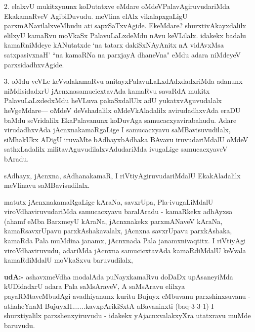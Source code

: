 \begin{artha}
2. elalxvU mukitxynunx koDutatxve eMdare oMdeVPalavAgiruvudariMda EkakamaRveV AgibiDuvudu. meVlina elAlx vikalapxgaLigU parxmANavilalxveMbudu ati sapxSaTxvAgide. EkeMdare? shurxtivAkayxdalilx elilxyU kamaRvu moVkaSx PalavuLaLxdeMdu nAvu keVLilalx. idakekx badalu kamaRniMdeye kANutatxde `na tatarx dakiSxNAyAnitx nA vidAvxMsa satxpasivxnaH' ``na kamaRNa na parxjayA dhaneVna" eMdu adara niMdeyeV parxsidadhxvAgide.
\end{artha}

\begin{artha}
3. oMdu veVLe keVvalakamaRvu anitayxPalavuLaLxdAdxdadxriMda adanunx niMdisidadxrU jAcnxnasamucicxtavAda kamaRvu savaRdA mukitx PalavuLaLxdedxMdu heVLuva pakaSxdalUlx adU yukatxvAguvudalalx heVgeMdare--- oMdeV deVshadalilx oMdeVkAladalilx avirudadhxvAda eraDU baMdu seVridalilx EkaPalavanunx koDuvAga samucacxyavirabahudu. Adare virudadhxvAda jAcnxnakamaRgaLige I samucacxyavu saMBavisuvudilalx, siMhakUkx ADigU iruvaMte bAdhayxbAdhaka BAvavu iruvudariMdalU oMdeV sathxLadalilx militavAguvudilalxvAdudariMda ivugaLige samucacxyaveV bAradu.
\end{artha}

\begin{artha}
sAdhayx, jAcnxna, sAdhanakamaR, I riVtiyAgiruvudariMdalU EkakAladalilx meVlinavu 
saMBavisudilalx.
\end{artha}


\begin{artha}
matutx jAcnxnakamaRgaLige kAraNa, savxrUpa, Pla-ivugaLiMdalU viroVdhaviruvudariMda samucacxyavu baralAradu - kamaRkekx adhAyxsa (ahamf eMba BarxmeyU kAraNa, jAcnxnakekx parxmANaveV kAraNa, kamaRsavxrUpavu parxkAshakavalalx, jAcnxna savxrUpavu parxkAshaka, kamaRda Pala muMdina janamx, jAcnxnada Pala janamxnivaqtitx. I riVtiyAgi viroVdhaviruvudu, adariMda jAcnxna samucicxtavAda kamaRdiMdalU keVvala kamaRdiMdalU moVkaSxvu baruvudilalx, 
\end{artha}


\begin{artha}
{\bf udA:-} ashavxmeVdha modalAda puNayxkamaRvu doDaDx upAsaneyiMda kUDidadxrU adara Pala saMsAraveV, A saMsAravu elilxya payaRMtaveMbudAgi avadhiyanunx kuritu Bujuyx eMbuvanu parxshinxsuvanu - athaheYnaM BujuyxH.......kavxpArikiSxtA aBavaninxti (baq-3-3-1) I shurxtiyalilx parxshenxyiruvudu - idakekx yAjacnxvalakxyXra utatxravu muMde baruvudu.
\end{artha}

